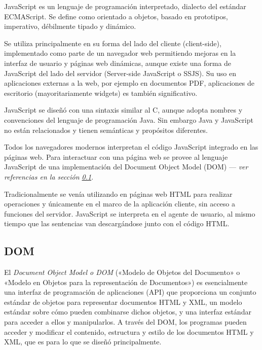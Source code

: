     JavaScript es un lenguaje de programación interpretado, dialecto del estándar ECMAScript. Se define como orientado a objetos, basado en prototipos, imperativo, débilmente tipado y dinámico.
    
    Se utiliza principalmente en su forma del lado del cliente (client-side), implementado como parte de un navegador web permitiendo mejoras en la interfaz de usuario y páginas web dinámicas, aunque existe una forma de JavaScript del lado del servidor (Server-side JavaScript o SSJS). Su uso en aplicaciones externas a la web, por ejemplo en documentos PDF, aplicaciones de escritorio (mayoritariamente widgets) es también significativo.
    
    JavaScript se diseñó con una sintaxis similar al C, aunque adopta nombres y convenciones del lenguaje de programación Java. Sin embargo Java y JavaScript no están relacionados y tienen semánticas y propósitos diferentes.
    
    Todos los navegadores modernos interpretan el código JavaScript integrado en las páginas web. Para interactuar con una página web se provee al lenguaje JavaScript de una implementación del Document Object Model (DOM) --- {\it ver referencias en la sección \ref{sub:tec_dom}}.
    
    Tradicionalmente se venía utilizando en páginas web HTML para realizar operaciones y únicamente en el marco de la aplicación cliente, sin acceso a funciones del servidor. JavaScript se interpreta en el agente de usuario, al mismo tiempo que las sentencias van descargándose junto con el código HTML.
    
  
  \subsection{DOM} %
    \label{sub:tec_dom}
    
    El {\it Document Object Model o DOM} («Modelo de Objetos del Documento» o «Modelo en Objetos para la representación de Documentos») es esencialmente una interfaz de programación de aplicaciones (API) que proporciona un conjunto estándar de objetos para representar documentos HTML y XML, un modelo estándar sobre cómo pueden combinarse dichos objetos, y una interfaz estándar para acceder a ellos y manipularlos. A través del DOM, los programas pueden acceder y modificar el contenido, estructura y estilo de los documentos HTML y XML, que es para lo que se diseñó principalmente.
    
